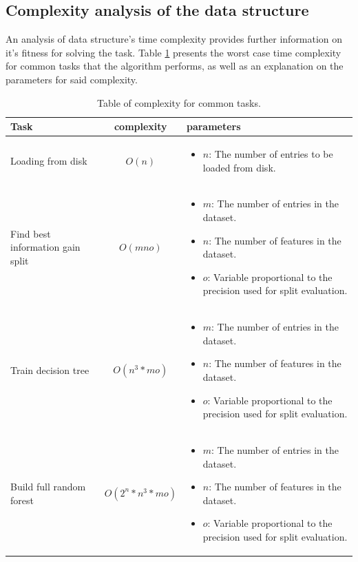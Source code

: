 \documentclass{acm_proc_article-sp}
\begin{document}
\subsection{Complexity analysis of the data structure}
An analysis of data structure's time complexity provides further information on it's fitness for solving the task. Table \ref{table:3} presents the worst case time complexity for common tasks that the algorithm performs, as well as an explanation on the parameters for said complexity.
\begin{table}[h]
  \centering
  \begin{tabular}{|p{}|c|p{}|}
    \hline
    Task                             & complexity         & parameters   \\ \hline
    Loading from disk                & $O(n)$      & \begin{itemize}[leftmargin=*]
    \item $n$: The number of entries to be loaded from disk.
    \end{itemize}   \\ \hline
    Find best information gain split & $O(mno)$    & \begin{itemize}[leftmargin=*]
    \item $m$: The number of entries in the dataset.
    \item $n$: The number of features in the dataset.
    \item $o$: Variable proportional to the precision used for split evaluation.
    \end{itemize}   \\ \hline
    Train decision tree & $O(n^3*mo)$ &
    \begin{itemize}[leftmargin=*]
    \item $m$: The number of entries in the dataset.
    \item $n$: The number of features in the dataset.
    \item $o$: Variable proportional to the precision used for split evaluation.
    \end{itemize}   \\ \hline
    Build full random forest & $O(2^n*n^3*mo)$ &
    \begin{itemize}[leftmargin=*]
    \item $m$: The number of entries in the dataset.
    \item $n$: The number of features in the dataset.
    \item $o$: Variable proportional to the precision used for split evaluation.
    \end{itemize}   \\ \hline
  \end{tabular}
  \caption{Table of complexity for common tasks.}
  \label{table:3}
\end{table}
\end{document}
